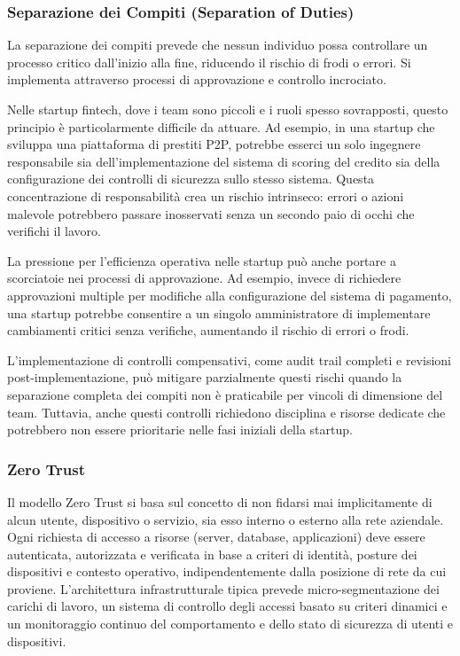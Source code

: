 \documentclass[a4paper,12pt]{report}
\begin{document}
\subsubsection{Separazione dei Compiti (Separation of Duties)}

La separazione dei compiti prevede che nessun individuo possa controllare un processo critico dall'inizio alla fine, riducendo il rischio di frodi o errori. Si implementa attraverso processi di approvazione e controllo incrociato.

Nelle startup fintech, dove i team sono piccoli e i ruoli spesso sovrapposti, questo principio è particolarmente difficile da attuare. Ad esempio, in una startup che sviluppa una piattaforma di prestiti P2P, potrebbe esserci un solo ingegnere responsabile sia dell'implementazione del sistema di scoring del credito sia della configurazione dei controlli di sicurezza sullo stesso sistema. Questa concentrazione di responsabilità crea un rischio intrinseco: errori o azioni malevole potrebbero passare inosservati senza un secondo paio di occhi che verifichi il lavoro.

La pressione per l'efficienza operativa nelle startup può anche portare a scorciatoie nei processi di approvazione. Ad esempio, invece di richiedere approvazioni multiple per modifiche alla configurazione del sistema di pagamento, una startup potrebbe consentire a un singolo amministratore di implementare cambiamenti critici senza verifiche, aumentando il rischio di errori o frodi.

L'implementazione di controlli compensativi, come audit trail completi e revisioni post-implementazione, può mitigare parzialmente questi rischi quando la separazione completa dei compiti non è praticabile per vincoli di dimensione del team. Tuttavia, anche questi controlli richiedono disciplina e risorse dedicate che potrebbero non essere prioritarie nelle fasi iniziali della startup.
\subsubsection{Zero Trust}
Il modello Zero Trust si basa sul concetto di non fidarsi mai implicitamente di alcun utente, dispositivo o servizio, sia esso interno o esterno alla rete aziendale. Ogni richiesta di accesso a risorse (server, database, applicazioni) deve essere autenticata, autorizzata e verificata in base a criteri di identità, posture dei dispositivi e contesto operativo, indipendentemente dalla posizione di rete da cui proviene. L’architettura infrastrutturale tipica prevede micro-segmentazione dei carichi di lavoro, un sistema di controllo degli accessi basato su criteri dinamici e un monitoraggio continuo del comportamento e dello stato di sicurezza di utenti e dispositivi.  
\end{document}
